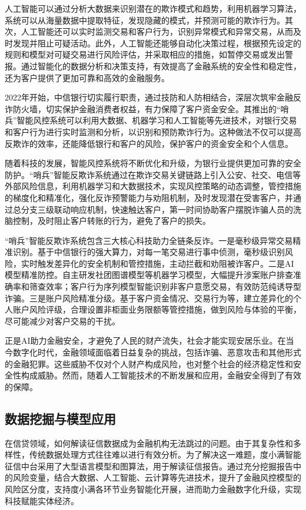 人工智能可以通过分析大数据来识别潜在的欺诈模式和趋势，利用机器学习算法，系统可以从海量数据中提取特征，发现隐藏的模式，并预测可能的欺诈行为。其次，人工智能还可以实时监测交易和客户行为，识别异常模式和异常交易，从而及时发现并阻止可疑活动。此外，人工智能还能够自动化决策过程，根据预先设定的规则和模型对可疑交易进行风险评估，并采取相应的措施，如暂停交易或发出警报。通过智能化的数据分析和决策支持，有效提高了金融系统的安全性和稳定性，还为客户提供了更加可靠和高效的金融服务。

2022年开始，中信银行切实履行职责，通过技防和人防相结合，深层次筑牢金融反诈防火墙，切实保护金融消费者权益，有力保障了客户资金安全。其推出的“哨兵”智能风控系统可以利用大数据、机器学习和人工智能等先进技术，对银行交易和客户行为进行实时监测和分析，以识别和预防欺诈行为。这种做法不仅可以提高反欺诈的效率，还能降低银行和客户的风险，保护客户的资金安全和个人信息。

随着科技的发展，智能风控系统将不断优化和升级，为银行业提供更加可靠的安全防护。“哨兵”智能反欺诈系统通过在欺诈交易关键链路上引入公安、社交、电信等外部风险信息，利用机器学习和大数据技术，实现风控策略的动态调整，管控措施的梯度化和精准化，强化反诈预警能力与劝阻机制，及时发现潜在受害客户，并通过总分支三级联动响应机制，快速触达客户，第一时间协助客户摆脱诈骗人员的洗脑控制，及时阻止客户转账的行为，避免了客户的损失。

“哨兵”智能反欺诈系统包含三大核心科技助力全链条反诈。一是毫秒级异常交易精准识别。基于中信银行的强大算力，对每一笔交易进行事中侦测，毫秒级识别风险，实时触发差异化的安全机制和管控措施，主动拦截和劝阻被诈客户。二是AI模型精准防控。自主研发社团图谱模型等机器学习模型，大幅提升涉案账户排查准确率和筛查效率；客户行为序列模型智能识别非客户意愿交易，有效防范纯诱导型诈骗。三是账户风险精准分级。基于客户资金情况、交易行为等，建立差异化的个人账户风险评级，合理设置非柜面业务限额等管控措施，做到风险与体验的平衡，尽可能减少对客户交易的干扰。

正是AI助力金融安全，才避免了人民的财产流失，社会才能实现安居乐业。在当今数字化时代，金融领域面临着日益复杂的挑战，包括诈骗、恶意攻击和其他形式的金融犯罪。这些威胁不仅对个人财产构成风险，也对整个社会的经济稳定性和安全性构成威胁。然而，随着人工智能技术的不断发展和应用，金融安全得到了有效的保障。


\subsection{数据挖掘与模型应用}
在信贷领域，如何解读征信数据成为金融机构无法跳过的问题。由于其复杂性和多样性，传统数据处理方式往往难以进行有效分析。为了解决这一难题，度小满智能征信中台采用了大型语言模型和图算法，用于解读征信报告。通过充分挖掘报告中的风险变量，结合大数据、人工智能、云计算等先进技术，提升了金融风控模型的风险区分度，支持度小满各环节业务智能化开展，进而助力金融数字化升级，实现科技赋能实体经济。

